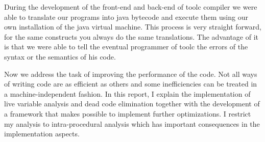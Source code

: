 During the development of the front-end and back-end of toolc compiler we were able to translate our programs into java bytecode and execute them using our own installation of the java virtual machine. This process is very straight forward, for the same constructs you always do the same translations. The advantage of it is that we were able to tell the eventual programmer of toolc the errors of the syntax or the semantics of his code.

Now we address the task of improving the performance of the code. Not all ways of writing code are as efficient as others and some inefficiencies can be treated in a machine-independent fashion. In this report, I explain the implementation of live variable analysis and dead code elimination together with the development of a framework that makes possible to implement further optimizations. I restrict my analysis to intra-procedural analysis which has important consequences in the implementation aspects. 

